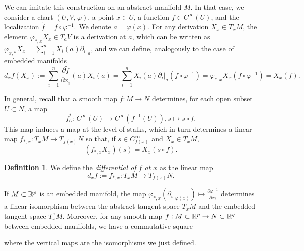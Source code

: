 \documentclass[11pt,a4paper]{book}
\theoremstyle{remark} \newtheorem{rmk}[thm]{Remark}
\theoremstyle{definition} \newtheorem{defn}[thm]{Definition}
\theoremstyle{definition} \newtheorem{ex}[thm]{Example}
\theoremstyle{definition} \newtheorem{ej}[thm]{Exercise}
\begin{document}
We can imitate this construction on an abstract manifold $M$. In that case, we consider a chart $(U,V,\varphi)$, a point $x\in U$, a function $f\in C^\infty(U)$, and the localization $\tilde{f}=f\circ \varphi^{-1}$. We denote $a=\varphi(x)$. For any derivation $X_x\in T_x M$, the element $\varphi_{*,x}X_x \in T_a V$ is a derivation at $a$, which can be written as $\varphi_{x,*}X_x=\sum_{i=1}^n X_i(a) \partial_i|_a$, and we can define, analogously to the case of embedded manifolds
\begin{equation*}
d_xf(X_x) := \sum_{i=1}^n \frac{\partial \tilde{f}}{\partial x_i} (a) X_i(a) = \sum_{i=1}^n X_i(a) \partial_i|_a (f\circ \varphi^{-1}) = \varphi_{*,x}X_x(f\circ \varphi^{-1})=X_x(f).
\end{equation*}

In general, recall that a smooth map $f:M\rightarrow N$ determines, for each open subset $U\subset N$, a map
\begin{equation*}
f_U^*: C^\infty(U) \rightarrow C^\infty(f^{-1}(U)), s \mapsto s \circ f.
\end{equation*}
This map induces a map at the level of stalks, which in turn determines a linear map $f_{*,x}:T_xM \rightarrow T_{f(x)}N$ so that, if $s\in C^\infty_{f(x)}$ and $X_x\in T_xM$,
\begin{equation*}
(f_{*,x}X_x)(s) = X_x(s\circ f).
\end{equation*}

\begin{defn}
  We define the \emph{differential of $f$ at $x$} as the linear map
  \begin{equation*}
d_xf:= f_{*,x}: T_xM \longrightarrow T_{f(x)}N.
  \end{equation*}
\end{defn}

If $M\subset \mathbb R^p$ is an embedded manifold, the map $\varphi_{*,x}(\partial_i|_{\varphi(x)})\mapsto \frac{\partial \varphi^{-1}}{\partial x_i}$ determines a linear isomorphism between the abstract tangent space $T_xM$ and the embedded tangent space $T^e_xM$. Moreover, for any smooth map $f:M\subset \mathbb R^p\rightarrow N\subset \mathbb R^q$ between embedded manifolds, we have a commutative square
\begin{center}
\end{center}
where the vertical maps are the isomorphisms we just defined.
\end{document}
